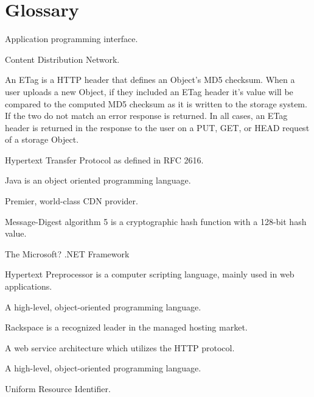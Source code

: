 \documentclass[letterpaper,10pt,english]{manual}
\begin{document}
\chapter{Glossary}
\begin{description}
\item[API]\hypertarget{term-api}{}
Application programming interface.

\item[CDN]\hypertarget{term-cdn}{}
Content Distribution Network.

\item[ETag]\hypertarget{term-etag}{}
An ETag is a HTTP header that defines an Object's MD5 checksum.
When a user uploads a new Object, if they included an ETag header
it's value will be compared to the computed MD5 checksum as it
is written to the storage system.  If the two do not match an
error response is returned.  In all cases, an ETag header is
returned in the response to the user on a PUT, GET, or HEAD
request of a storage Object.

\item[HTTP]\hypertarget{term-http}{}
Hypertext Transfer Protocol as defined in RFC 2616.

\item[Java]\hypertarget{term-java}{}
Java is an object oriented programming language.

\item[Limelight Networks]\hypertarget{term-limelight-networks}{}
Premier, world-class CDN provider.

\item[MD5]\hypertarget{term-md5}{}
Message-Digest algorithm 5 is a cryptographic hash function
with a 128-bit hash value.

\item[.NET]\hypertarget{term-net}{}
The Microsoft? .NET Framework

\item[PHP]\hypertarget{term-php}{}
Hypertext Preprocessor is a computer scripting language, mainly
used in web applications.

\item[Python]\hypertarget{term-python}{}
A high-level, object-oriented programming language.

\item[Rackspace]\hypertarget{term-rackspace}{}
Rackspace is a recognized leader in the managed hosting market.

\item[ReST]\hypertarget{term-rest}{}
A web service architecture which utilizes the HTTP protocol.

\item[Ruby]\hypertarget{term-ruby}{}
A high-level, object-oriented programming language.

\item[URI]\hypertarget{term-uri}{}
Uniform Resource Identifier.

\end{description}


\renewcommand{\indexname}{Module Index}

\renewcommand{\indexname}{Index}
\printindex
\end{document}
